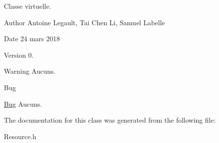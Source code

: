 Classe virtuelle. \begin{DoxyAuthor}{Author}
Antoine Legault, Tai Chen Li, Samuel Labelle 
\end{DoxyAuthor}
\begin{DoxyDate}{Date}
24 mars 2018 
\end{DoxyDate}
\begin{DoxyVersion}{Version}
0. 
\end{DoxyVersion}
\begin{DoxyWarning}{Warning}
Aucuns. 
\end{DoxyWarning}
\begin{DoxyRefDesc}{Bug}
\item[\hyperlink{bug__bug000015}{Bug}]Aucuns. \end{DoxyRefDesc}


The documentation for this class was generated from the following file\+:\begin{DoxyCompactItemize}
\item 
Resource.\+h\end{DoxyCompactItemize}
